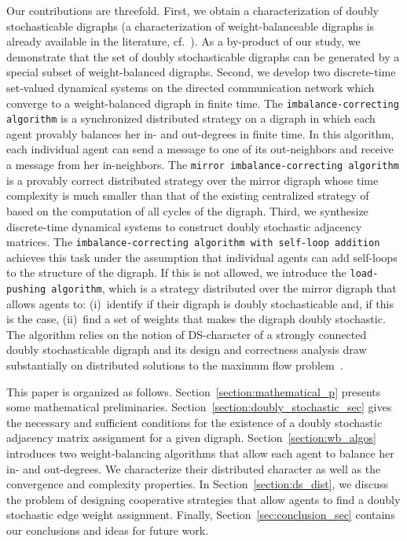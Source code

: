 \documentclass[final]{siamltex}
\begin{document}
Our contributions are threefold.  First, we obtain a characterization
of doubly stochasticable digraphs (a characterization of
weight-balanceable digraphs is already available in the literature,
cf.~\cite{LHT:70}).  As a by-product of our study, we demonstrate that
the set of doubly stochasticable digraphs can be generated by a
special subset of weight-balanced digraphs.  Second, we develop two
discrete-time set-valued dynamical systems on the directed
communication network which converge to a weight-balanced digraph in
finite time. The {\texttt{imbalance-correcting algorithm}\xspace} is a synchronized distributed strategy on a
digraph in which each agent provably balances her in- and out-degrees
in finite time. In this algorithm, each individual agent can send a
message to one of its out-neighbors and receive a message from her
in-neighbors.
The {\texttt{mirror imbalance-correcting
    algorithm}\xspace} is a provably correct distributed strategy over the mirror
digraph whose time complexity is much smaller than that of the
existing centralized strategy of~\cite{LHT:70} based on the
computation of all cycles of the digraph. Third, we synthesize
discrete-time dynamical systems to construct doubly stochastic
adjacency matrices. The {\texttt{imbalance-correcting algorithm with
    self-loop addition}\xspace} achieves this task under the assumption
that individual agents can add self-loops to the structure of the
digraph.  If this is not allowed, we introduce the {\texttt{load-pushing algorithm}\xspace}, which is
a strategy distributed over the mirror digraph that allows agents to:
(i)~identify if their digraph is doubly stochasticable and, if this is
the case, (ii)~find a set of weights that makes the digraph doubly
stochastic. The algorithm relies on the notion of DS-character of a
strongly connected doubly stochasticable digraph and its design and
correctness analysis draw substantially on distributed solutions to
the maximum flow problem~\cite{RKA-TLM-JBO:93,TLP-IL-MB-SHD:05}.

This paper is organized as follows.
Section~\ref{section:mathematical_p} presents some mathematical
preliminaries.  Section~\ref{section:doubly_stochastic_sec} gives the
necessary and sufficient conditions for the existence of a doubly
stochastic adjacency matrix assignment for a given digraph.
Section~\ref{section:wb_algos} introduces two weight-balancing
algorithms that allow each agent to balance her in- and
out-degrees. We characterize their distributed character as well as
the convergence and complexity properties.  In 
Section~\ref{section:ds_dist}, we discuss the problem of designing
cooperative strategies that allow agents to find a doubly stochastic
edge weight assignment.  Finally, Section~\ref{sec:conclusion_sec}
contains our conclusions and ideas for future work.
\end{document}
